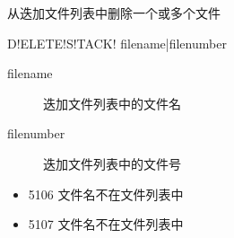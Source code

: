 \label{sss:deletestack}

从迭加文件列表中删除一个或多个文件

\begin{SACSTX}
D!ELETE!S!TACK! filename|filenumber
\end{SACSTX}

\begin{description}
\item [filename] 迭加文件列表中的文件名
\item [filenumber] 迭加文件列表中的文件号
\end{description}

\begin{itemize}
\item 5106 文件名不在文件列表中
\item 5107 文件名不在文件列表中
\end{itemize}

